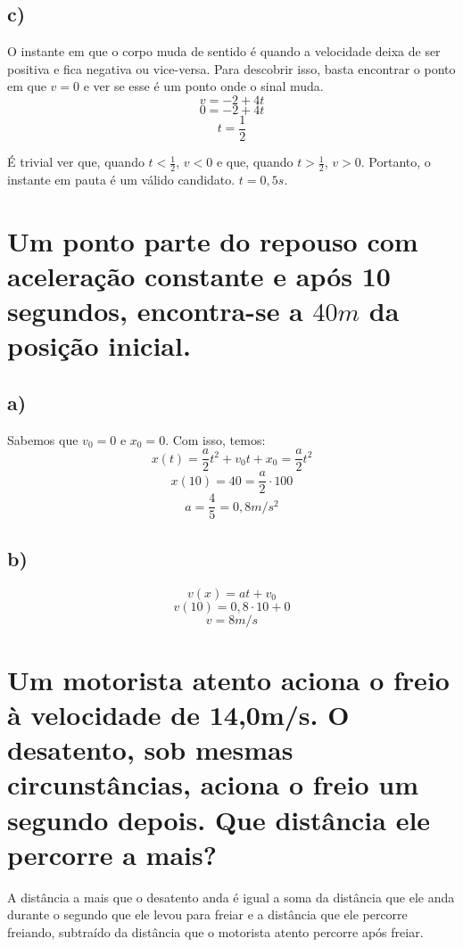 \documentclass{article}
\begin{document}
    \subsection{c)}
        \hspace{\parindent}O instante em que o corpo muda de sentido é quando a velocidade deixa de ser positiva e fica negativa ou vice-versa. Para descobrir isso, basta encontrar o ponto em que \(v=0\) e ver se esse é um ponto onde o sinal muda.
        \[v=-2+4t\]
        \[0=-2+4t\]
        \[t=\frac{1}{2}\]
        \par É trivial ver que, quando \(t<\frac{1}{2}\), \(v<0\) e que, quando \(t>\frac{1}{2}\), \(v>0\). Portanto, o instante em pauta é um válido candidato. \(t = 0,5s\).

\section{Um ponto parte do repouso com aceleração constante e após 10 segundos, encontra-se a \(40m\) da posição inicial.}

    \subsection{a)}
    \par Sabemos que \(v_0 = 0\) e \(x_0 = 0\). Com isso, temos:
        \[x(t)=\frac{a}{2}t^2 + v_0t + x_0=\frac{a}{2}t^2\]
        \[x(10)=40=\frac{a}{2}\cdot 100\]
        \[a=\frac{4}{5}=0,8m/s^2\]
    
    \subsection{b)}
        \[v(x)=at + v_0\]
        \[v(10)=0,8\cdot 10 + 0\]
        \[v=8m/s\]

\section{Um motorista atento aciona o freio à velocidade de 14,0m/s. O desatento, sob mesmas circunstâncias, aciona o freio um segundo depois. Que distância ele percorre a mais?} 

    \hspace{\parindent}A distância a mais que o desatento anda é igual a soma da distância que ele anda durante o segundo que ele levou para freiar e a distância que ele percorre freiando, subtraído da distância que o motorista atento percorre após freiar.
\end{document}
